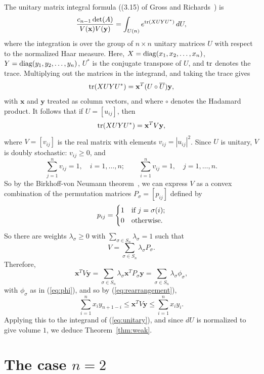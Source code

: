 \documentclass[12pt]{article}
\def\bfx{\mathbf{x}}
\def\bfy{\mathbf{y}}
\def\tr{{\rm tr}}
\begin{document}
The unitary matrix integral formula
((3.15) of Gross and Richards~\cite{GrossRichards:1989})
is
\begin{equation}\label{eq:unitary}
 \frac{c_{n-1} \det(A)}{V(\bfx) V(\bfy)}
   = \int_{U(n)} e^{\tr(XUYU^*)} \, dU,
\end{equation}
where the integration is over the group of $n \times n$ unitary
matrices $U$ with respect to the normalized Haar measure.
Here,
$X = {\rm diag}(x_1,x_2,\ldots,x_n)$,
$Y = {\rm diag}(y_1,y_2,\ldots,y_n)$,
$U^*$ is the conjugate transpose of $U$, and ${\tr}$ denotes the
trace.
Multiplying out the matrices in the integrand, and taking
the trace gives
$$ \tr(XUYU^*) = \bfx^T (U \circ \overline{U}) \bfy, $$
with $\bfx$ and $\bfy$ treated as column vectors, and where
$\circ$ denotes the Hadamard product.
It follows that if $U = [u_{ij}]$, then
$$ \tr(XUYU^*) = \bfx^T V \bfy, $$
where $V = [v_{ij}]$ is the real matrix with elements
$v_{ij} = |u_{ij}|^2$.
Since $U$ is unitary, $V$ is doubly stochastic:
$v_{ij} \ge 0$, and
$$ \sum_{j=1}^n v_{ij} = 1, \quad i=1,\ldots,n; \qquad
 \sum_{i=1}^n v_{ij} = 1, \quad j=1,\ldots,n. $$
So by the Birkhoff-von Neumann theorem~\cite[p. 63]{Bapat:1997},
we can express $V$ as a convex combination of the permutation matrices
$P_\sigma = [p_{ij}]$ defined by
$$ p_{ij} = \begin{cases} 1 & \hbox{if $j = \sigma(i)$;} \cr
                          0 & \hbox{otherwise}.
\end{cases}
$$
So there are weights $\lambda_\sigma \ge 0$ with
$\sum_{\sigma \in S_n} \lambda_\sigma = 1$ such that
$$ V = \sum_{\sigma \in S_n} \lambda_\sigma P_\sigma. $$
Therefore,
$$ \bfx^T V \bfy = 
\sum_{\sigma \in S_n} \lambda_\sigma \bfx^T P_\sigma \bfy
 = \sum_{\sigma \in S_n} \lambda_\sigma \phi_\sigma, $$
with $\phi_\sigma$ as in (\ref{eq:phi}),
and so by (\ref{eq:rearrangement}),
$$ \sum_{i=1}^n x_i y_{n+1-i}
   \le \bfx^T V \bfy \le \sum_{i=1}^n x_i y_i. $$
Applying this to the integrand of (\ref{eq:unitary}),
and since $dU$ is normalized to give volume $1$, we
deduce Theorem~\ref{thm:weak}.

\section{The case $n=2$}
\end{document}
